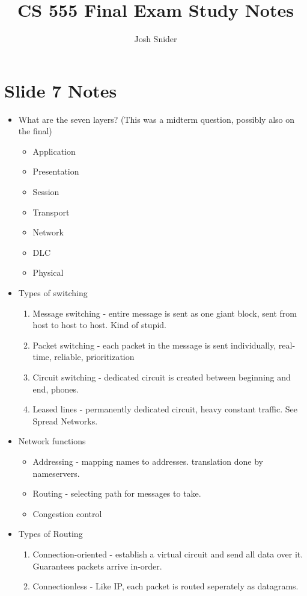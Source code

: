 \documentclass{scrartcl}
\begin{document}
\title{CS 555 Final Exam Study Notes}
\author{Josh Snider}
\maketitle
\section*{Slide 7 Notes}
\begin{itemize}
\item What are the seven layers? (This was a midterm question, possibly also on
 the final)
\begin{itemize}
\item Application
\item Presentation
\item Session
\item Transport
\item Network
\item DLC
\item Physical
\end{itemize}
\item Types of switching
\begin{enumerate}
\item Message switching - entire message is sent as one giant block, sent from 
host to host to host. Kind of stupid.
\item Packet switching - each packet in the message is sent individually, 
real-time, reliable, prioritization
\item Circuit switching - dedicated circuit is created between beginning and 
end, phones.
\item Leased lines - permanently dedicated circuit, heavy constant traffic. 
See Spread Networks.
\end{enumerate}
\item Network functions
\begin{itemize}
\item Addressing - mapping names to addresses. translation done by nameservers.
\item Routing - selecting path for messages to take.
\item Congestion control
\end{itemize}
\item Types of Routing
\begin{enumerate}
\item Connection-oriented - establish a virtual circuit and send all data over 
it. Guarantees packets arrive in-order.
\item Connectionless - Like IP, each packet is routed seperately as datagrams.

\end{enumerate}
\end{itemize}
\end{document}

